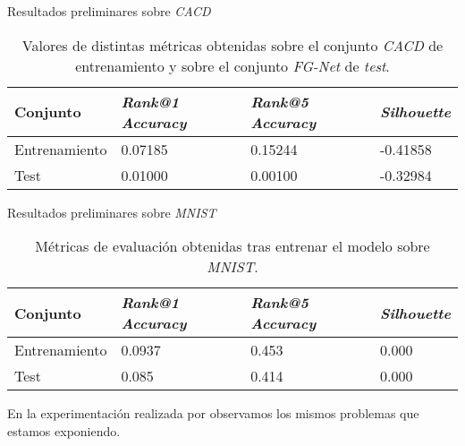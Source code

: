 \begin{frame}{Resultados preliminares sobre \textit{CACD}}
	\begin{table}
		\centering
		\begin{tabular}{|l|l|l|l|}
			\hline
			Conjunto      & \textit{Rank@1 Accuracy} & \textit{Rank@5 Accuracy} & \textit{Silhouette} \\
			\hline

			Entrenamiento & 0.07185                  & 0.15244                  & -0.41858            \\
			Test          & 0.01000                  & 0.00100                  & -0.32984            \\
			\hline
		\end{tabular}
		\caption{Valores de distintas métricas obtenidas sobre el conjunto \textit{CACD} de entrenamiento y sobre el conjunto \textit{FG-Net} de \textit{test}.}
		\label{table:resultados_sobre_fg_net}
	\end{table}

\end{frame}

\begin{frame}{Resultados preliminares sobre \textit{MNIST}}

	\begin{table}
		\centering
		\begin{tabular}{|l|l|l|l|}
			\hline
			Conjunto      & \textit{Rank@1 Accuracy} & \textit{Rank@5 Accuracy} & \textit{Silhouette} \\
			\hline

			Entrenamiento & 0.0937                   & 0.453                    & 0.000               \\
			Test          & 0.085                    & 0.414                    & 0.000               \\


			\hline
		\end{tabular}
		\caption{Métricas de evaluación obtenidas tras entrenar el modelo sobre \textit{MNIST}.}
		\label{table:resultados_mnist_mal}
	\end{table}

	En la experimentación realizada por  observamos los mismos problemas que estamos exponiendo.

\end{frame}

